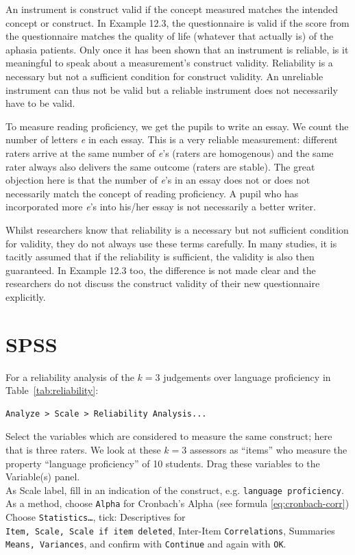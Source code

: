 \documentclass[
]{book}
\begin{document}
An instrument is construct valid if the concept measured matches
the intended concept or construct. In
Example 12.3, the questionnaire is valid if the score from
the questionnaire matches the quality of life (whatever that actually
is) of the aphasia patients. Only once it has been shown that
an instrument is reliable, is it meaningful to speak about a measurement's
construct validity. Reliability is a necessary but not a sufficient condition for
construct validity. An unreliable
instrument can thus not be valid but a reliable instrument does not necessarily
have to be valid.

To measure reading proficiency, we get the pupils to write
an essay. We count the number of letters \emph{e} in each essay. This is
a very reliable measurement: different raters arrive at the same
number of \emph{e}'s (raters are homogenous) and the same rater always also
delivers the same outcome (raters are stable). The great objection here is that
the number of \emph{e}'s in an essay does not or does not necessarily match the concept
of reading proficiency. A pupil who has incorporated more \emph{e}'s into his/her essay
is not necessarily a better writer.

Whilst researchers know that reliability is a necessary but not
sufficient condition for validity, they do not always use these terms
carefully. In many studies, it is tacitly
assumed that if the reliability is sufficient, the validity
is also then guaranteed. In Example 12.3 too, the difference is not
made clear and
the researchers do not discuss the construct validity of their new
questionnaire explicitly.

\section{SPSS}\label{spss-9}

For a reliability analysis of the \(k=3\) judgements over
language proficiency in
Table~\ref{tab:reliability}:\\

\begin{verbatim}
Analyze > Scale > Reliability Analysis...
\end{verbatim}

Select the variables which are considered to measure the same construct;
here that is three raters. We look at these \(k=3\)
assessors as ``items'' who measure the property ``language proficiency'' of 10
students. Drag these variables to the Variable(s) panel.\\
As Scale label, fill in an indication of the construct, e.g.
\texttt{language\ proficiency}.\\
As a method, choose \texttt{Alpha} for Cronbach's Alpha (see formula
\eqref{eq:cronbach-corr})\\
Choose \texttt{Statistics…}, tick: Descriptives for
\texttt{Item,\ Scale,\ Scale\ if\ item\ deleted}, Inter-Item \texttt{Correlations},
Summaries \texttt{Means,\ Variances}, and confirm with \texttt{Continue} and again
with \texttt{OK}.
\end{document}
